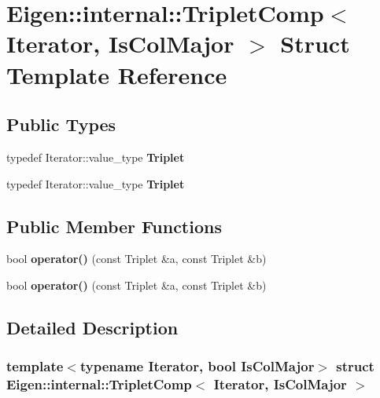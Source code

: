 \hypertarget{struct_eigen_1_1internal_1_1_triplet_comp}{}\section{Eigen\+:\+:internal\+:\+:Triplet\+Comp$<$ Iterator, Is\+Col\+Major $>$ Struct Template Reference}
\label{struct_eigen_1_1internal_1_1_triplet_comp}
\subsection*{Public Types}
\begin{DoxyCompactItemize}
\item 
\mbox{\label{struct_eigen_1_1internal_1_1_triplet_comp_a16ad8c37b63c879c7a8779becde0865a}} 
typedef Iterator\+::value\+\_\+type {\bfseries Triplet}
\item 
\mbox{\label{struct_eigen_1_1internal_1_1_triplet_comp_a16ad8c37b63c879c7a8779becde0865a}} 
typedef Iterator\+::value\+\_\+type {\bfseries Triplet}
\end{DoxyCompactItemize}
\subsection*{Public Member Functions}
\begin{DoxyCompactItemize}
\item 
\mbox{\label{struct_eigen_1_1internal_1_1_triplet_comp_a09e342f3268e2f93b0f763418e892c57}} 
bool {\bfseries operator()} (const Triplet \&a, const Triplet \&b)
\item 
\mbox{\label{struct_eigen_1_1internal_1_1_triplet_comp_a09e342f3268e2f93b0f763418e892c57}} 
bool {\bfseries operator()} (const Triplet \&a, const Triplet \&b)
\end{DoxyCompactItemize}


\subsection{Detailed Description}
\subsubsection*{template$<$typename Iterator, bool Is\+Col\+Major$>$\newline
struct Eigen\+::internal\+::\+Triplet\+Comp$<$ Iterator, Is\+Col\+Major $>$}



